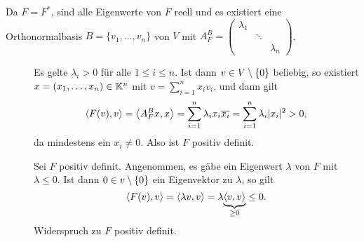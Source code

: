 \begin{beweis}
	Da $F = F^*$, sind alle Eigenwerte von $F$ reell und es existiert eine Orthonormalbasis $B = \{v_1,\dots,v_n\}$ von $V$ mit $A^B_F = \begin{pmatrix}
	\lambda_1 & & \\ & \ddots & \\ & & \lambda_n \end{pmatrix}$.
	\begin{description}
		\item[\bewrueck] Es gelte $\lambda_i > 0$ für alle $1 \leq i \leq n$.
		Ist dann $v \in V \setminus \{0\}$ beliebig, so existiert  $x = (x_1,\dots,x_n) \in \mathbb{K}^n$ mit $v = \sum_{i=1}^{n} x_i v_i$, und dann gilt
		\[
			\left\langle F(v),v\right\rangle = \left\langle A_F^B x,x\right\rangle = \sum_{i=1}^{n} \lambda_i x_i \overline{x_i} = \sum_{i=1}^{n} \lambda_i \lvert x_i\rvert^2 > 0,
		\]
		da mindestens ein $x_i \neq 0$.
		Also ist $F$ positiv definit.
		\item[\bewhin] Sei $F$ positiv definit.
		Angenommen, es gäbe ein Eigenwert $\lambda$ von $F$ mit $\lambda \leq 0$.
		Ist dann $0 \in v \setminus \{0\}$ ein Eigenvektor zu $\lambda$, so gilt
		\[
			\left\langle F(v),v\right\rangle = \left\langle\lambda v,v\right\rangle = \lambda {\underbrace{\left\langle v,v\right\rangle}_{\geq 0}} \leq 0.
		\]
		Widerspruch zu $F$ positiv definit. \qedhere
	\end{description}
\end{beweis}
\newpage